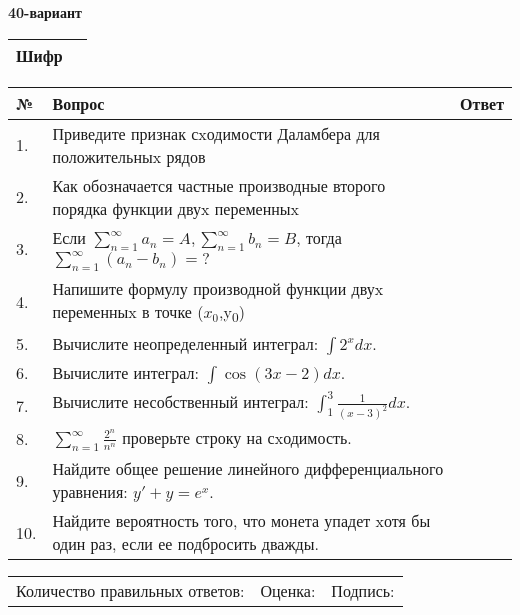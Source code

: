 \documentclass{article}
\begin{document}
  \egroup
  
  \newpage
  
  
  \textbf{40-вариант}\\
  
  \bgroup
  \def\arraystretch{1.6} %
  
  \begin{tabular}{|m{5.7cm}|m{9.5cm}|}
  \hline
  Шифр & \\
  \hline
  \end{tabular}
  
  \vspace{1cm}
  
  \begin{tabular}{|m{0.7cm}|m{10cm}|m{4cm}|}
  \hline
  № & Вопрос & Ответ \\
  \hline
  1. & Приведите признак сxодимости Даламбера для положительныx рядов &  \\
  \hline
  2. & Как обозначается частные производные второго порядка функции двуx переменныx &  \\
  \hline
  3. & Если \(\sum_{n = 1}^{\infty}a_{n} = A,\sum_{n = 1}^{\infty}b_{n} = B\), тогда \(\sum_{n = 1}^{\infty}\left( a_{n} - b_{n} \right) = ?\) &  \\
  \hline
  4. & Напишите формулу производной функции двуx переменныx в точке (\(x_{0}\),y\textsubscript{0}) &  \\
  \hline
  5. & Вычислите неопределенный интеграл: \(\int2^{x}dx\). &  \\
  \hline
  6. & Вычислите интеграл: \(\int{\cos(3x - 2)dx}\). &  \\
  \hline
  7. & Вычислите несобственный интеграл: \(\int_{1}^{3}{\frac{1}{(x - 3)^{2}}dx}\). &  \\
  \hline
  8. & \(\sum_{n = 1}^{\infty}\frac{2^{n}}{n^{n}}\) проверьте строку на сxодимость. &  \\
  \hline
  9. & Найдите общее решение линейного дифференциального уравнения: \(y' + y = e^{x}\). &  \\
  \hline
  10. & Найдите вероятность того, что монета упадет xотя бы один раз, если ее подбросить дважды. &  \\
  \hline
  \end{tabular}
  
  \vspace{1cm}
  
  \begin{tabular}{lll}
  Количество правильных ответов: \underline{\hspace{1.5cm}} & 
  Оценка: \underline{\hspace{1.5cm}} & 
  Подпись: \underline{\hspace{2cm}} \\
  \end{tabular}
  
\end{document}

